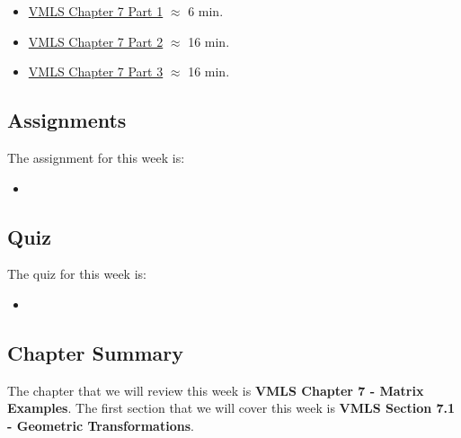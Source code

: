 \begin{itemize}
    \item \href{https://www.youtube.com/watch?v=jXN50fuRSqE}{VMLS Chapter 7 Part 1} $\approx$ 6 min.
    \item \href{https://www.youtube.com/watch?v=v7CH2ry-vrQ}{VMLS Chapter 7 Part 2} $\approx$ 16 min.
    \item \href{https://www.youtube.com/watch?v=kTg0vKppOl8}{VMLS Chapter 7 Part 3} $\approx$ 16 min.
\end{itemize}

\subsection{Assignments}

The assignment for this week is:

\begin{itemize}
    \item {}
\end{itemize}

\subsection{Quiz}

The quiz for this week is:

\begin{itemize}
    \item {}
\end{itemize}

\newpage

\subsection{Chapter Summary}

The chapter that we will review this week is \textbf{VMLS Chapter 7 - Matrix Examples}. The first section that we will cover this week is \textbf{VMLS Section 7.1 - Geometric Transformations}.


